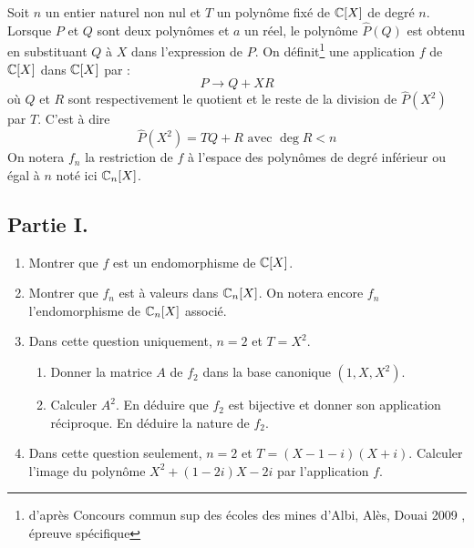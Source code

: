 Soit $n$ un entier naturel non nul et $T$ un polynôme fixé de $\mathbb{C}[X]$ de degré $n$.\newline
Lorsque $P$ et $Q$ sont deux polynômes et $a$ un réel, le polynôme $\widehat{P}(Q)$ est obtenu en substituant $Q$ à $X$ dans l'expression de $P$.\newline
On définit\footnote{d'après Concours commun sup des écoles des mines d'Albi, Alès, Douai 2009 , épreuve spécifique} une application $f$ de $\mathbb{C}[X]$ dans $\mathbb{C}[X]$ par :
\begin{displaymath}
 P \rightarrow Q + XR
\end{displaymath}
où $Q$ et $R$ sont respectivement le quotient et le reste de la division de $\widehat{P}(X^2)$ par $T$. C'est à dire
\begin{displaymath}
\widehat{P}(X^2) = TQ +R \text{ avec } \deg R < n
\end{displaymath}
On notera $f_n$ la restriction de $f$ à l'espace des polynômes de degré inférieur ou égal à $n$ noté ici $\mathbb{C}_n[X]$.
\subsection*{Partie I.}
\begin{enumerate}
 \item Montrer que $f$ est un endomorphisme de $\mathbb{C}[X]$.
\item Montrer que $f_n$ est à valeurs dans $\mathbb{C}_n[X]$. On notera encore $f_n$ l'endomorphisme de $\mathbb{C}_n[X]$ associé.
\item Dans cette question uniquement, $n=2$ et $T=X^2$.
\begin{enumerate}
 \item Donner la matrice $A$ de $f_2$ dans la base canonique $(1,X,X^2)$.
\item Calculer $A^2$. En déduire que $f_2$ est bijective et donner son application réciproque. En déduire la nature de $f_2$.
\end{enumerate}
 \item Dans cette question seulement, $n=2$ et $T=(X-1-i)(X+i)$. Calculer l'image du polynôme $X^2+(1-2i)X-2i$ par l'application $f$.
\end{enumerate}

